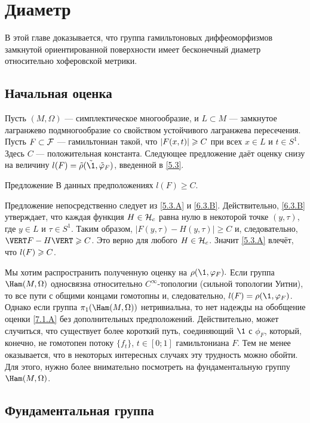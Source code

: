 \chapter{Диаметр}

В этой главе доказывается, что группа гамильтоновых диффеоморфизмов
замкнутой ориентированной поверхности имеет бесконечный диаметр
относительно хоферовской метрики. 

\section{Начальная оценка}
Пусть $(M, \Omega)$ — симплектическое многообразие, и $L \subset M$
— замкнутое лагранжево подмногообразие со свойством  устойчивого
лагранжева пересечения. 
Пусть $F \subset \mathcal{F}$ — гамильтониан такой, что $| F (x, t) | \z\ge C$
при всех $x \in L$ и $t \in S^1$. 
Здесь $C$ — положительная константа.
Следующее предложение даёт оценку снизу на величину $l (F) \z=
\tilde\rho (\tilde\1, \tilde\phi_F)$, введенной в \ref{5.3}. 

\begin{thm}{Предложение}\label{7.1.A}
В данных предположениях $l (F) \ge C$.
\end{thm}

Предложение непосредственно следует из \ref{5.3.A} и \ref{6.3.B}.
Действительно, \ref{6.3.B} утверждает, что каждая функция $H \z\in \H_c$ равна нулю в некоторой точке $(y, \tau)$, где $y \in L$ и $\tau \in S^1$.
Таким образом, $| F (y, \tau) - H (y, \tau) | \ge C$ и, следовательно, $\VERT F - H \VERT \z\ge C$.
Это верно для любого $H \in \mathcal{H}_c$.
Значит \ref{5.3.A} влечёт, что $l (F) \z\ge C$.
\qeds

Мы хотим распространить полученную оценку на $\rho (\1, \phi_F).$
Если группа $\Ham (M, \Omega)$ односвязна относительно
$C^\infty$-топологии (сильной топологии Уитни), то все пути с общими
концами гомотопны и, следовательно, $l (F) = \rho (\1, \phi_F)$. 
Однако если группа $\pi_1 (\Ham (M, \Omega))$
нетривиальна, то нет надежды на обобщение оценки \ref{7.1.A} без
дополнительных предположений. 
Действительно, может случиться, что существует более короткий путь, соединяющий $\1$ с $\phi_F$, который,
конечно, не гомотопен потоку $\{f_t\}$, $t \in [0; 1]$ гамильтониана
$F$. 
Тем не менее оказывается, что в некоторых интересных случаях эту трудность можно обойти.
Для этого, нужно более внимательно посмотреть на фундаментальную группу $\Ham (M, \Omega)$.

\section{Фундаментальная группа}

